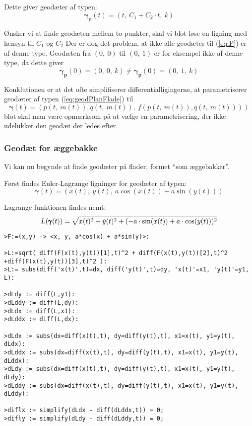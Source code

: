 Dette giver geodæter af typen:
\begin{equation*}
\pmb{\gamma_p}(t) = (t,~C_1 + C_2 \cdot t,~k)
\end{equation*}
 
 Ønsker vi at finde geodæten mellem to punkter, skal vi blot løse en ligning med hensyn til \(C_1\) og \(C_2\)
 Der er dog det problem, at ikke alle geodæter til (\ref{eq:P}) er af denne type.
 Geodæten fra \((0,~0)\) til \((0,~1)\) er for eksempel ikke af denne type, da dette giver
 \begin{equation*}
 \pmb{\gamma_p}(0) = (0,~0,~k) \neq  \pmb{\gamma_p}(0) = (0,~1,~k)
 \end{equation*}

Konklutionen er at det ofte simplifiserer differentialligingerne,
at parametriserer geodæter af typen (\ref{eq:geodPlanFlade}) til
\begin{equation*}
\pmb{\gamma}(t) = (p(t,~m(t)),q(t,~m(t)),~f(p(t,~m(t)),q(t,~m(t))))
\end{equation*}
blot skal man være opmærksom på at vælge en parametrisering, der ikke udelukker den geodæt der ledes efter.

\subsubsection{Geodæt for æggebakke }

Vi kan nu begynde at finde geodæter på flader, formet ``som æggebakker''.

Først findes Euler-Lagrange ligninger for geodæter af typen:
\begin{equation}\label{eq:aeggegeo}
\pmb{\gamma}(t) = (x(t),~y(t),~a\cos(x(t)) + a\sin(y(t)))
\end{equation}

Lagrange funktionen findes nemt:
\begin{equation*}
L(\pmb{\gamma}(t)) = \sqrt{\dot{x}(t)^2 + \dot{y}(t)^2 + ( -a \cdot \sin(x(t)) + a \cdot \cos(y(t)) )^2}
\end{equation*}
 
\begin{lstlisting}[caption=Udregning af de to Lagrange ligninger til (\ref{eq:aeggegeo}) med \emph{Maple}  ]
>F:=(x,y) -> <x, y, a*cos(x) + a*sin(y)>:

>L:=sqrt( diff(F(x(t),y(t))[1],t)^2 + diff(F(x(t),y(t))[2],t)^2 +diff(F(x(t),y(t))[3],t)^2 ):
>L:= subs(diff('x(t)',t)=dx, diff('y(t)',t)=dy, 'x(t)'=x1, 'y(t)'=y1, L):

>dLdy := diff(L,y1):
>dLddy := diff(L,dy):
>dLdx := diff(L,x1):
>dLddx := diff(L,dx):

>dLdx := subs(dx=diff(x(t),t), dy=diff(y(t),t), x1=x(t), y1=y(t), dLdx):
>dLddx := subs(dx=diff(x(t),t), dy=diff(y(t),t), x1=x(t), y1=y(t), dLddx):
>dLdy := subs(dx=diff(x(t),t), dy=diff(y(t),t), x1=x(t), y1=y(t), dLdy):
>dLddy := subs(dx=diff(x(t),t), dy=diff(y(t),t), x1=x(t), y1=y(t), dLddy):

>diflx := simplify(dLdx - diff(dLddx,t)) = 0;
>difly := simplify(dLdy - diff(dLddy,t)) = 0;
\end{lstlisting}

